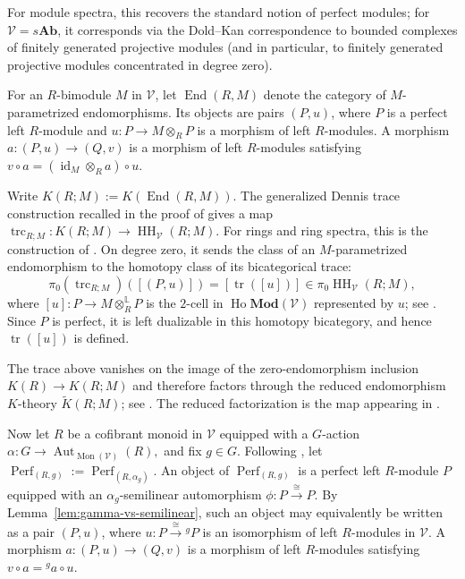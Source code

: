 \documentclass[11pt,oneside]{amsart}
\DeclareMathOperator{\Ho}{Ho}
\DeclareMathOperator{\HH}{HH}
\DeclareMathOperator{\Perf}{Perf}
\DeclareMathOperator{\End}{End}
\DeclareMathOperator{\id}{id}
\numberwithin{equation}{section}
\numberwithin{figure}{section}
\theoremstyle{plain}
\theoremstyle{definition}
\theoremstyle{remark}
\begin{document}
For module spectra, this recovers the standard notion of perfect modules; for \(\mathcal V=s\mathbf{Ab}\), it corresponds via the Dold--Kan correspondence to bounded complexes of finitely generated projective modules (and in particular, to finitely generated projective modules concentrated in degree zero).

For an $R$-bimodule $M$ in $\mathcal V$, let $\End(R,M)$ denote the category of $M$-parametrized endomorphisms. Its objects are pairs $(P,u)$, where $P$ is a perfect left $R$-module and 
\(
u\colon P\to M\otimes_R P
\)
is a morphism of left $R$-modules. A morphism 
\(
a\colon(P,u)\to(Q,v)
\)
is a morphism of left $R$-modules satisfying 
\(
v\circ a = (\id_M\otimes_R a)\circ u.
\)

Write 
\(
K(R;M) := K(\End(R,M)).
\)
The generalized Dennis trace construction recalled in the proof of \cite[Theorem~6.1.1]{AGHKK} gives a map 
\(
\operatorname{trc}_{R;M}\colon
K(R;M)\longrightarrow\HH_{\mathcal V}(R;M).
\)
For rings and ring spectra, this is the construction of \cite[Definition~6.16]{CLMPI}. On degree zero, it sends the class of an $M$-parametrized endomorphism to the homotopy class of its bicategorical trace:
\[
\pi_0(\operatorname{trc}_{R;M})([(P,u)])
= [\operatorname{tr}([u])]
\in
\pi_0\HH_{\mathcal V}(R;M),
\]
where 
\([u]\colon
P\longrightarrow M\otimes_R^{\mathbb L}P
\)
is the $2$-cell in $\Ho\mathbf{Mod}(\mathcal V)$ represented by $u$; see \cite[Example~6.26]{CLMPI}. Since $P$ is perfect, it is left dualizable in this homotopy bicategory, and hence $\operatorname{tr}([u])$ is defined.

The trace above vanishes on the image of the zero-endomorphism inclusion 
\(
K(R)\to K(R;M)
\)
and therefore factors through the reduced endomorphism $K$-theory $\widetilde{K}(R;M)$; see \cite[Remark~6.21]{CLMPI}. The reduced factorization is the map appearing in \cite[Theorem~1.2]{CLMPI}.  

Now let $R$ be a cofibrant monoid in $\mathcal V$ equipped with a $G$-action 
\(
\alpha\colon
G\to
\operatorname{Aut}_{\operatorname{Mon}(\mathcal V)}(R),
\)
and fix $g\in G$. Following \cite[Section~6.1]{AGHKK}, let 
\(
\Perf_{(R,g)}
:=
\Perf_{(R,\alpha_g)}.
\)
An object of $\Perf_{(R,g)}$ is a perfect left $R$-module $P$ equipped with an $\alpha_g$-semilinear automorphism 
\(
\phi\colon P\xrightarrow{\cong}P.
\)
By Lemma~\ref{lem:gamma-vs-semilinear}, such an object may equivalently be written as a pair $(P,u)$, where 
\(
u\colon P\xrightarrow{\cong}{}^gP
\)
is an isomorphism of left $R$-modules in $\mathcal V$. A morphism 
\(
a\colon(P,u)\longrightarrow(Q,v)
\)
is a morphism of left $R$-modules satisfying 
\(
v\circ a={}^g a\circ u.
\)
\end{document}
